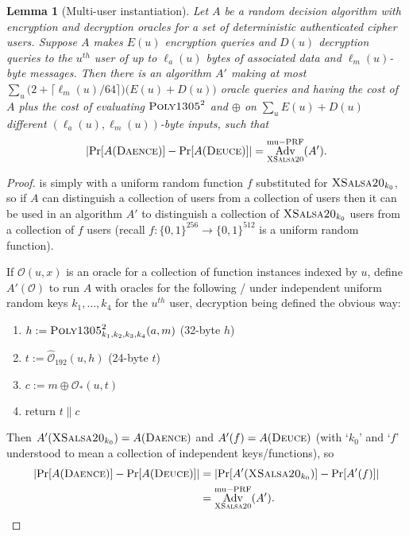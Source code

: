 \documentclass[draft]{article}
\newtheorem{lemma}{Lemma}
\DeclareRobustCommand{\operatorsc}[1]{{%
  \ifmmode\let\next=\operatorname\else\let\next=\relax\fi\next{\textsc{#1}}}}
\def\XSalsa#1/{\operatorsc{XSalsa#1}}
\def\Poly#1/{\operatorsc{Poly#1}}
\def\Daence/{\operatorsc{Daence}}
\def\Deuce/{\operatorsc{Deuce}}
\DeclareMathOperator{\Adv}{Adv}
\DeclareMathOperator{\muPRF}{mu-PRF}
\newcommand{\concat}{\mathbin\|}
\begin{document}
\begin{lemma}[Multi-user instantiation]\label{lem-mu-instance}
  Let $A$ be a random decision algorithm with encryption and
   decryption oracles for a \emph{set} of deterministic authenticated
   cipher users.
  Suppose $A$ makes $E(u)$ encryption queries and $D(u)$ decryption
   queries to the $u^{\mathit{th}}$ user of up to $\ell_a(u)$ bytes of
   associated data and $\ell_m(u)$-byte messages.
  Then there is an algorithm $A'$ making at most
   $\sum_u \bigl(2 + \lceil\ell_m(u)/64\rceil\bigr)
     \bigl(E(u) + D(u)\bigr)$
   oracle queries and having the cost of $A$ plus the cost of
   evaluating $\Poly1305/^2$ and $\oplus$ on
   $\sum_u E(u) + D(u)$
   different $(\ell_a(u), \ell_m(u))$-byte inputs,
   such that
  \[
    \lvert\Pr[A(\Daence/)] - \Pr[A(\Deuce/)]\rvert
    = \Adv^{\muPRF}_{\XSalsa20/}(A').
  \]
\end{lemma}

\begin{proof}
  \Deuce/ is simply \Daence/ with a uniform random function $f$
   substituted for $\XSalsa20/_{k_0}$, so if $A$ can distinguish a
   collection of \Daence/ users from a collection of \Deuce/ users then
   it can be used in an algorithm $A'$ to distinguish a collection of
   $\XSalsa20/_{k_0}$ users from a collection of $f$ users (recall
   $f\colon \{0,1\}^{256} \to \{0,1\}^{512}$ is a
   uniform random function).

  If $\mathcal O(u,x)$ is an oracle for a collection of function
   instances indexed by $u$, define $A'(\mathcal O)$ to run $A$ with
   oracles for the following \DAE/ under independent uniform random keys
   $k_1,\dotsc,k_4$ for the $u^{\mathit{th}}$ user, decryption being
   defined the obvious way:
%
  \begin{enumerate}
    \item $h := \Poly1305/^2_{k_1,k_2,k_3,k_4}(a, m)$
      \hfill (32-byte $h$)
    \item $t := \hat{\mathcal O}_{192}(u, h)$
      \hfill (24-byte $t$)
    \item $c := m \oplus \mathcal O_*(u, t)$
    \item return $t \concat c$
  \end{enumerate}
%
  Then $A'(\XSalsa20/_{k_0}) = A(\Daence/)$ and $A'(f) = A(\Deuce/)$
   (with `$k_0$' and `$f$' understood to mean a collection of
   independent keys/functions), so
  \begin{align*}
    \lvert\Pr[A(\Daence/)] - \Pr[A(\Deuce/)]\rvert
    &= \lvert\Pr[A'(\XSalsa20/_{k_0})] - \Pr[A'(f)]\rvert \\
    &= \Adv^{\muPRF}_{\XSalsa20/}(A').
    \qedhere
  \end{align*}
\end{proof}

\end{document}
